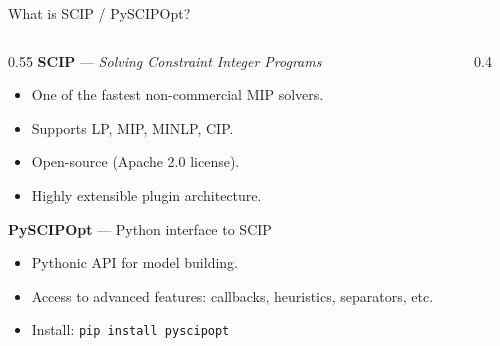 \documentclass[aspectratio=169,10pt]{beamer}
\begin{document}
\begin{frame}{What is SCIP / PySCIPOpt?}
\begin{columns}[T]
\begin{column}{0.55\textwidth}
  \textbf{SCIP} --- \emph{Solving Constraint Integer Programs}
  \begin{itemize}
    \item One of the fastest non-commercial MIP solvers.
    \item Supports LP, MIP, MINLP, CIP.
    \item Open-source (Apache 2.0 license).
    \item Highly extensible plugin architecture.
  \end{itemize}

  \medskip
  \textbf{PySCIPOpt} --- Python interface to SCIP
  \begin{itemize}
    \item Pythonic API for model building.
    \item Access to advanced features: callbacks, heuristics, separators, etc.
    \item Install: \texttt{pip install pyscipopt}
  \end{itemize}
\end{column}
\begin{column}{0.4\textwidth}
  \begin{center}
  \end{center}
\end{column}
\end{columns}
\end{frame}
\end{document}
